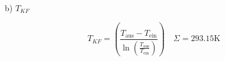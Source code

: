 b) $T_{KF}$

\[
T_{KF} = \left( \frac{T_{\text{aus}} - T_{\text{ein}}}{\ln \left( \frac{T_{\text{aus}}}{T_{\text{ein}}} \right)} \right) \quad \Sigma = 293.15 \text{K}
\]